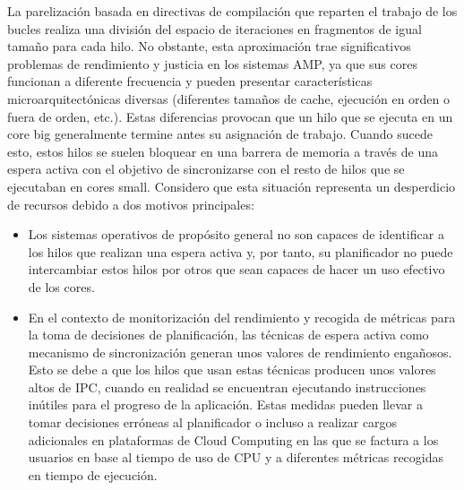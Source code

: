 La parelización basada en directivas de compilación que reparten el trabajo de los bucles realiza una división del espacio de iteraciones en fragmentos de igual tamaño para cada hilo. No obstante, esta aproximación trae significativos problemas de rendimiento y justicia en los sistemas AMP, ya que sus cores funcionan a diferente frecuencia y pueden presentar características microarquitectónicas diversas (diferentes tamaños de cache, ejecución en orden o fuera de orden, etc.). Estas diferencias provocan que un hilo que se ejecuta en un core big generalmente termine antes su asignación de trabajo. Cuando sucede esto, estos hilos se suelen bloquear en una barrera de memoria a través de una espera activa con el objetivo de sincronizarse con el resto de hilos que se ejecutaban en cores small. Considero que esta situación representa un desperdicio de recursos debido a dos motivos principales:

\begin{itemize}
	\item Los sistemas operativos de propósito general no son capaces de identificar a los hilos que realizan una espera activa y, por tanto, su planificador no puede intercambiar estos hilos por otros que sean capaces de hacer un uso efectivo de los cores.
	\item En el contexto de monitorización del rendimiento y recogida de métricas para la toma de decisiones de planificación, las técnicas de espera activa como mecanismo de sincronización generan unos valores de rendimiento engañosos. Esto se debe a que los hilos que usan estas técnicas producen unos valores altos de IPC, cuando en realidad se encuentran ejecutando instrucciones inútiles para el progreso de la aplicación. Estas medidas pueden llevar a tomar decisiones erróneas al planificador o incluso a realizar cargos adicionales en plataformas de Cloud Computing en las que se factura a los usuarios en base al tiempo de uso de CPU y a diferentes métricas recogidas en tiempo de ejecución.
\end{itemize}


